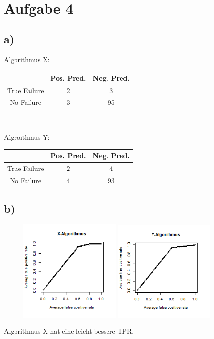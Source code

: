 \section*{Aufgabe 4}
\subsection*{a)}
\begin{multicols}{2}
	\raggedright
	Algorithmus X:\\
	\begin{center}
		\begin{tabular}{|c|c|c|}\hline
			& Pos. Pred. &Neg. Pred.\\\hline
			True Failure &2& 3\\\hline
			No Failure&3&95\\\hline
		\end{tabular}\\
	\end{center}
\columnbreak
	Algroithmus Y:\\
	\begin{center}\begin{tabular}{|c|c|c|}\hline
			& Pos. Pred. &Neg. Pred.\\\hline
			True Failure &2& 4\\\hline
			No Failure&4&93\\\hline
		\end{tabular}
	\end{center}
\end{multicols}
\subsection*{b)}
\begin{center}
	\begin{figure}[h]
		\centering
		\includegraphics[width=0.45\textwidth]{../4/Screenshots/X.png}
		\includegraphics[width=0.45\textwidth]{../4/Screenshots/Y.png}
	\end{figure}
 	Algorithmus X hat eine leicht bessere TPR.
\end{center}


